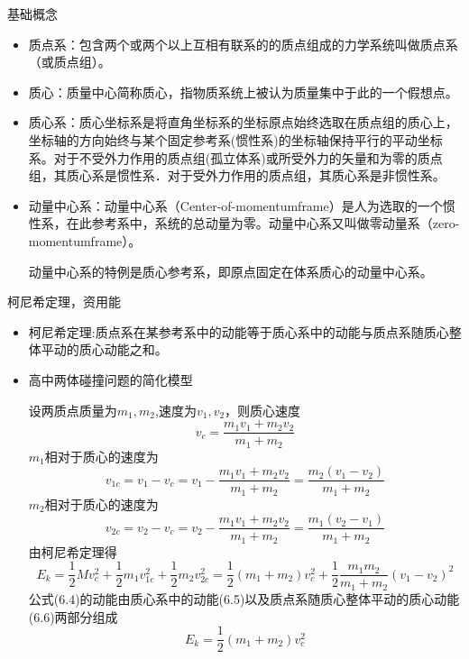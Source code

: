 \begin{problemset}
	\item 基础概念
	\begin{itemize}
		\item 质点系：包含两个或两个以上互相有联系的的质点组成的力学系统叫做质点系（或质点组）。
		\item 质心：质量中心简称质心，指物质系统上被认为质量集中于此的一个假想点。
		\item 质心系：质心坐标系是将直角坐标系的坐标原点始终选取在质点组的质心上，坐标轴的方向始终与某个固定参考系(惯性系)的坐标轴保持平行的平动坐标系。对于不受外力作用的质点组(孤立体系)或所受外力的矢量和为零的质点组，其质心系是惯性系．对于受外力作用的质点组，其质心系是非惯性系。
		\item 动量中心系：动量中心系（Center-of-momentumframe）是人为选取的一个惯性系，在此参考系中，系统的总动量为零。动量中心系又叫做零动量系（zero-momentumframe）。
		
		动量中心系的特例是质心参考系，即原点固定在体系质心的动量中心系。
	\end{itemize}
	\item 柯尼希定理，资用能
	\begin{itemize}
		\item 柯尼希定理:质点系在某参考系中的动能等于质心系中的动能与质点系随质心整体平动的质心动能之和。
		\item 高中两体碰撞问题的简化模型
		
		设两质点质量为$m_1,m_2$,速度为$v_1,v_2$，则质心速度
		\begin{equation}
			v_c=\dfrac{m_{1} v_{1}+m_{2} v_{2}}{m_{1}+m_{2}}
		\end{equation}
		$m_1$相对于质心的速度为
		\begin{equation}
			v_{1c}=v_1-v_c=v_1-\dfrac{m_{1} v_{1}+m_{2} v_{2}}{m_{1}+m_{2}}=\dfrac{m_2(v_1-v_2)}{m_1+m_2}
		\end{equation}
		$m_2$相对于质心的速度为
		\begin{equation}
			v_{2c}=v_2-v_c=v_2-\dfrac{m_{1} v_{1}+m_{2} v_{2}}{m_{1}+m_{2}}=\dfrac{m_1(v_2-v_1)}{m_1+m_2}
		\end{equation}
		由柯尼希定理得
		\begin{equation}
			E_k=\dfrac{1}{2}Mv_c^2+\dfrac{1}{2}m_1v_{1c}^2+\dfrac{1}{2}m_2v_{2c}^2=\dfrac{1}{2}(m_1+m_2)v_c^2+\dfrac{1}{2}\dfrac{m_1m_2}{m_1+m_2}(v_1-v_2)^2
		\end{equation}
		公式(6.4)的动能由质心系中的动能(6.5)以及质点系随质心整体平动的质心动能(6.6)两部分组成
		\begin{equation}
			E_k=\dfrac{1}{2}(m_1+m_2)v_c^2
		\end{equation}
		

\end{itemize}
\end{problemset}
